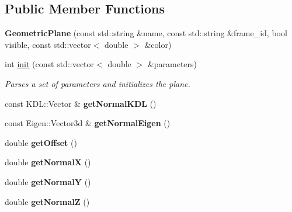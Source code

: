 \subsection*{Public Member Functions}
\begin{DoxyCompactItemize}
\item 
\hypertarget{classhiqp_1_1geometric__primitives_1_1GeometricPlane_a7d3def175b904855cf5ea41cd9af8827}{{\bfseries Geometric\-Plane} (const std\-::string \&name, const std\-::string \&frame\-\_\-id, bool visible, const std\-::vector$<$ double $>$ \&color)}\label{classhiqp_1_1geometric__primitives_1_1GeometricPlane_a7d3def175b904855cf5ea41cd9af8827}

\item 
int \hyperlink{classhiqp_1_1geometric__primitives_1_1GeometricPlane_aab4a9f1dd2c9b295e0963e53c4f13639}{init} (const std\-::vector$<$ double $>$ \&parameters)
\begin{DoxyCompactList}\small\item\em Parses a set of parameters and initializes the plane. \end{DoxyCompactList}\item 
\hypertarget{classhiqp_1_1geometric__primitives_1_1GeometricPlane_a6a5aaa0b81018b78c5fe7a1341f3004d}{const K\-D\-L\-::\-Vector \& {\bfseries get\-Normal\-K\-D\-L} ()}\label{classhiqp_1_1geometric__primitives_1_1GeometricPlane_a6a5aaa0b81018b78c5fe7a1341f3004d}

\item 
\hypertarget{classhiqp_1_1geometric__primitives_1_1GeometricPlane_aed12e48eda6560efd1987d2835a4b979}{const Eigen\-::\-Vector3d \& {\bfseries get\-Normal\-Eigen} ()}\label{classhiqp_1_1geometric__primitives_1_1GeometricPlane_aed12e48eda6560efd1987d2835a4b979}

\item 
\hypertarget{classhiqp_1_1geometric__primitives_1_1GeometricPlane_ac7944001fff45bb0f3c9a400f9242bec}{double {\bfseries get\-Offset} ()}\label{classhiqp_1_1geometric__primitives_1_1GeometricPlane_ac7944001fff45bb0f3c9a400f9242bec}

\item 
\hypertarget{classhiqp_1_1geometric__primitives_1_1GeometricPlane_a01c9232f32e246d3e35ce8e06866599d}{double {\bfseries get\-Normal\-X} ()}\label{classhiqp_1_1geometric__primitives_1_1GeometricPlane_a01c9232f32e246d3e35ce8e06866599d}

\item 
\hypertarget{classhiqp_1_1geometric__primitives_1_1GeometricPlane_ab4031f917695ab570cc46428324474a5}{double {\bfseries get\-Normal\-Y} ()}\label{classhiqp_1_1geometric__primitives_1_1GeometricPlane_ab4031f917695ab570cc46428324474a5}

\item 
\hypertarget{classhiqp_1_1geometric__primitives_1_1GeometricPlane_aa755d2dfb0603c8492ebb7efac831cfb}{double {\bfseries get\-Normal\-Z} ()}\label{classhiqp_1_1geometric__primitives_1_1GeometricPlane_aa755d2dfb0603c8492ebb7efac831cfb}

\end{DoxyCompactItemize}

